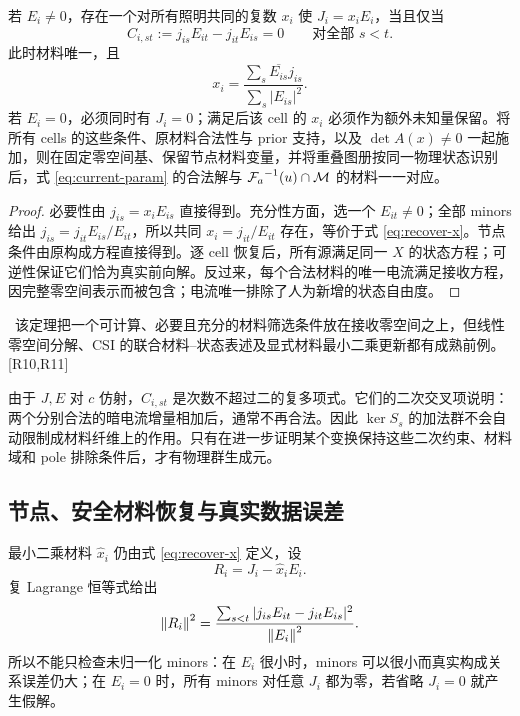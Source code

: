 \begin{theorem}[共享标量材料的精确可实现性]
若 $E_i\ne0$，存在一个对所有照明共同的复数 $x_i$ 使 $J_i=x_iE_i$，当且仅当
\begin{equation}
C_{i,st}:=j_{is}E_{it}-j_{it}E_{is}=0\qquad\text{对全部 }s<t.\label{eq:minors}
\end{equation}
此时材料唯一，且
\begin{equation}
x_i=\frac{\sum_s\overline{E_{is}}j_{is}}{\sum_s|E_{is}|^2}.\label{eq:recover-x}
\end{equation}
若 $E_i=0$，必须同时有 $J_i=0$；满足后该 cell 的 $x_i$ 必须作为额外未知量保留。将所有 cells 的这些条件、原材料合法性与 prior 支持，以及 $\det A(x)\ne0$ 一起施加，则在固定零空间基、保留节点材料变量，并将重叠图册按同一物理状态识别后，式 \eqref{eq:current-param} 的合法解与 ${\mathcal F_a}^{-1}(u)\cap\mathcal M$ 的材料一一对应。
\end{theorem}
\begin{proof}
必要性由 $j_{is}=x_iE_{is}$ 直接得到。充分性方面，选一个 $E_{it}\ne0$；全部 minors 给出 $j_{is}=j_{it}E_{is}/E_{it}$，所以共同 $x_i=j_{it}/E_{it}$ 存在，等价于式 \eqref{eq:recover-x}。节点条件由原构成方程直接得到。逐 cell 恢复后，所有源满足同一 $X$ 的状态方程；可逆性保证它们恰为真实前向解。反过来，每个合法材料的唯一电流满足接收方程，因完整零空间表示而被包含；电流唯一排除了人为新增的状态自由度。
\end{proof}
\tagphy\ 该定理把一个可计算、必要且充分的材料筛选条件放在接收零空间之上，但线性零空间分解、CSI 的联合材料--状态表述及显式材料最小二乘更新都有成熟前例。[R10,R11]

由于 $J,E$ 对 $c$ 仿射，$C_{i,st}$ 是次数不超过二的复多项式。它们的二次交叉项说明：两个分别合法的暗电流增量相加后，通常不再合法。因此 $\ker S_s$ 的加法群不会自动限制成材料纤维上的作用。只有在进一步证明某个变换保持这些二次约束、材料域和 pole 排除条件后，才有物理群生成元。

\subsection{节点、安全材料恢复与真实数据误差}

最小二乘材料 $\widehat x_i$ 仍由式 \eqref{eq:recover-x} 定义，设
\begin{equation}
R_i=J_i-\widehat x_iE_i.
\end{equation}
复 Lagrange 恒等式给出
\begin{equation}
\left\lVert R_i\right\rVert^2
=\frac{\sum_{s<t}|j_{is}E_{it}-j_{it}E_{is}|^2}{\left\lVert E_i\right\rVert^2}.\label{eq:minors-residual}
\end{equation}
所以不能只检查未归一化 minors：在 $E_i$ 很小时，minors 可以很小而真实构成关系误差仍大；在 $E_i=0$ 时，所有 minors 对任意 $J_i$ 都为零，若省略 $J_i=0$ 就产生假解。


